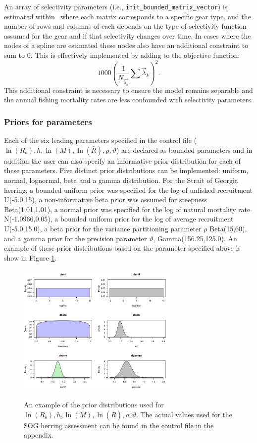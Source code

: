 An array of selectivity parameters (i.e., \verb"init_bounded_matrix_vector") is estimated within \iscam\, where each matrix corresponds to a specific gear type, and the number of rows and columns of each depends on the type of selectivity function assumed for the gear and if that selectivity changes over time.  In cases where the nodes of a spline are estimated these nodes also have an additional constraint to sum to 0.  This is effectively implemented by adding to the objective function: \[ 1000 \left(\frac{1}{N_{\vec{\lambda_k}}}\sum \vec{\lambda}_k \right)^2.\]  This additional constraint is necessary to ensure the model remains separable and the annual fishing mortality rates are less confounded with selectivity parameters.

\subsubsection{Priors for parameters}
	Each of the six leading parameters specified in the control file ($\ln(R_o),h,\ln(M),\ln(\bar{R}),\rho,\vartheta$) are declared as bounded parameters and in addition the user can also specify an informative prior distribution for each of these parameters.  Five distinct prior distributions can be implemented: uniform, normal, lognormal, beta and a gamma distribution.  For the Strait of Georgia herring, a bounded uniform prior was specified for  the log of unfished recruitment U(-5.0,15), a non-informative beta prior was assumed for steepness Beta(1.01,1.01), a normal prior was specified for the log of natural mortality rate N(-1.0966,0.05), a bounded uniform prior for the log of average recruitment U(-5.0,15.0), a beta prior for the variance partitioning parameter $\rho$ Beta(15,60), and a gamma prior for the precision parameter $\vartheta$, Gamma(156.25,125.0). An example of these prior distributions based on the parameter specified above is show in Figure \ref{FigPriorExample}. 
	
\begin{figure}[!tbp]
	\centering
	\includegraphics[width=0.7\textwidth]{../Figs/priorexample.pdf}\\
	\caption{An example of the prior distributions used for $\ln(R_o),h,\ln(M),\ln(\bar{R}),\rho,\vartheta$.  The actual values used for the SOG herring assessment can be found in the control file in the appendix.}\label{FigPriorExample}
\end{figure}

